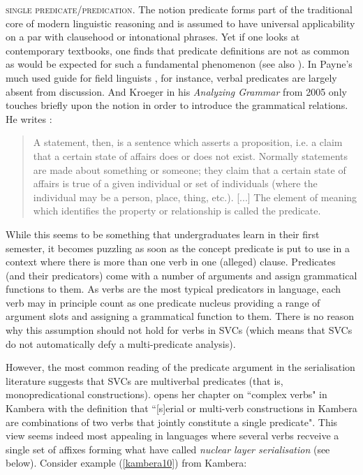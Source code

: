 \textsc{single predicate/predication}. The notion predicate forms part of the traditional core of modern linguistic reasoning and is assumed to have universal applicability on a par with clausehood or intonational phrases. Yet if one looks at contemporary textbooks, one finds that predicate definitions are not as common as would be expected for such a fundamental phenomenon (see also \citealt{baker2010complex}). In Payne's much used guide for field linguists \parencite{payne1997describing}, for instance, verbal predicates are largely absent from discussion. And Kroeger in his \textit{Analyzing Grammar} from 2005 only touches briefly upon the notion in order to introduce the grammatical relations. He writes \citep[53]{kroeger2005analyzing}:
\begin{quote}A statement, then, is a sentence which asserts a proposition, i.e. a claim that a certain state of affairs does or does not exist. Normally statements are made about something or someone; they claim that a certain state of affairs is true of a given individual or set of individuals (where the individual may
be a person, place, thing, etc.). [...] The element of meaning which identifies the property or relationship is called the predicate.\end{quote}
While this seems to be something that undergraduates learn in their first se\-mes\-ter, it becomes puzzling as soon as the concept predicate is put to use in a context where there is more than one verb in one (alleged) clause. Predicates (and their predicators) come with a number of arguments and assign grammatical functions to them. As verbs are the most typical predicators in language, each verb may in principle count as one predicate nucleus providing a range of argument slots and assigning a grammatical function to them. There is no reason why this assumption should not hold for verbs in SVCs (which means that SVCs do not automatically defy a multi-predicate analysis).

However, the most common reading of the predicate argument in the serialisation literature suggests that SVCs are multiverbal predicates (that is, monopredicational constructions). \citet{klamer1998grammar} opens her chapter on ``complex verbs" in Kambera with the definition that ``[s]erial or multi-verb constructions in Kambera are combinations of two verbs that jointly constitute a single predicate". This view seems indeed most appealing in languages where several verbs recveive a single set of affixes forming what \citet{foley1984functional} have called \textit{nuclear layer serialisation} (see  below). Consider example (\ref{kambera10}) from Kambera:


